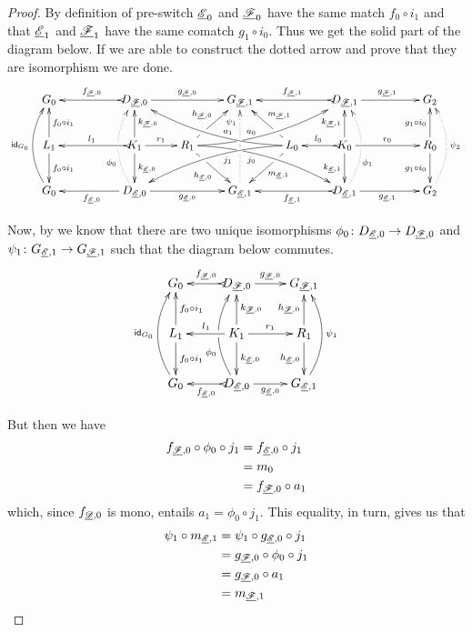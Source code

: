 \begin{proof}
	By definition of pre-switch $\underline{\mathscr{E}}_0$ and $\underline{\mathscr{F}}_0$ have the same match $f_0\circ i_1$ and that $\underline{\mathscr{E}}_1$ and $\underline{\mathscr{F}}_1$ have the same comatch $g_1\circ i_0$. Thus we get the solid part of the diagram below. If we are able to construct the dotted arrow and prove that they are isomorphism we are done.
	\[\xymatrix@C=22pt{G_{0} && \ar@{>->}[ll]_{f_{\der{F},0}} D_{\der{F},0} \ar[rr]^{g_{\der{F},0}}&& G_{\der{F},1} && \ar@{>->}[ll]_{f_{\der{F},1}} D_{\der{F},1} \ar[rr]^{g_{\der{F},1}}&& G_{2}\\L_1 \ar[d]^{f_0\circ i_1} \ar[u]_{f_0\circ i_1}&& K_{1} \ar[d]^{k_{\der{E},0}} \ar[u]_{k_{\der{F},0}}\ar@{>->}[ll]_{l_1} \ar[r]^{r_1} & R_{1} \ar@/^.35cm/[drrr]|(.315)\hole_(.4){j_0} \ar[dr]|(.3)\hole_{h_{\der{E},0}} \ar@/_.35cm/[urrr]|(.315)\hole^(.4){a_0} \ar[ur]|(.3)\hole^{h_{\der{F},0}}& &L_{0} \ar@/_.35cm/[dlll]^(.4){j_1} \ar[dl]|(.3)\hole^{m_{\der{E},1}} \ar@/^.35cm/[ulll]_(.4){a_1} \ar[ul]|(.3)\hole_{m_{\der{F},1}}& K_{0} \ar[d]_{k_{\der{E},1}} \ar[u]^{k_{\der{F},1}}\ar@{>->}[l]_{l_{0}} \ar[rr]^{r_0} && R_{0} \ar[d]_{g_1\circ i_0} \ar[u]^{g_1\circ i_0}\\ \ar@/^.5cm/[uu]^{\id{G_0}} G_{0} && \ar[ll]^{f_{\der{E},0}} D_{\der{E},0} \ar@{.>}@/^.5cm/[uu]^(.33){\phi_{0}}|\hole \ar[rr]_{g_{\der{E},0}}&& G_{\der{E},1} \ar@{.>}[uu]^(.76){\psi_1}|(.45)\hole |(.55)\hole&& \ar@{>->}[ll]^{f_{\der{E},1}} D_{\der{E},1} \ar@{.>}@/_.5cm/[uu]_(.33){\phi_{1}}|\hole\ar[rr]_{g_{\der{E},1}}&& G_{2}\ar@{.>}@/_.5cm/[uu]_{\psi_2}}\]
	
	Now, by  we know that there are two unique isomorphisms $\phi_0\colon D_{\underline{\mathscr{E}},0}\to D_{\underline{\mathscr{F}},0}$ and $\psi_1 \colon G_{\underline{\mathscr{E}},1}\to G_{\underline{\mathscr{F}},1}$ such that the diagram below commutes.
	\[\xymatrix{G_{0} & \ar@{>->}[l]_{f_{\der{F},0}} D_{\der{F},0} \ar[r]^{g_{\der{F},0}}& G_{\der{F},1} \\L_1 \ar[d]^{f_0\circ i_1} \ar[u]_{f_0\circ i_1}& K_{1} \ar[d]^{k_{\der{E},0}} \ar[u]_{k_{\der{F},0}}\ar[l]_{l_1} \ar[r]^{r_1} & R_{1}  \ar[d]_{h_{\der{E},0}}  \ar[u]^{h_{\der{F},0}}\\ \ar@/^.5cm/[uu]^{\id{G_0}} G_{0} & \ar@{>->}[l]^{f_{\der{E},0}} D_{\der{E},0} \ar@/^.5cm/[uu]^(.33){\phi_{0}}|\hole \ar[r]_{g_{\der{E},0}}& G_{\der{E},1} \ar@/_.5cm/[uu]_{\psi_1}}\]
	
	But then we have
	\begin{align*}
		f_{\underline{\mathscr{F}},0}\circ \phi_0\circ j_1&=f_{\underline{\mathscr{E}},0} \circ j_1\\&=m_0\\&=f_{\underline{\mathscr{F}},0}\circ a_1 \end{align*}
	which, since $f_{\underline{\mathscr{D}},0}$ is mono, entails $a_1= \phi_0\circ j_1$.	This equality, in turn, gives us that
	\begin{align*}
		\psi_1\circ m_{\underline{\mathscr{E}},1}&=\psi_1 \circ g_{\underline{\mathscr{E}},0}\circ j_1\\&=g_{\underline{\mathscr{F}},0}\circ \phi_0\circ j_1\\&=g_{\underline{\mathscr{F}},0}\circ a_1\\&=m_{\underline{\mathscr{F}},1}
	\end{align*}
	

\end{proof}
